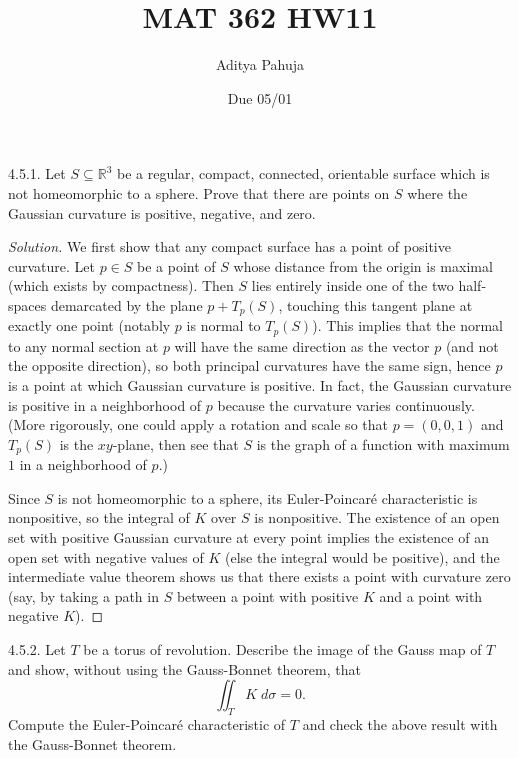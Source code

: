 \documentclass[10pt]{scrartcl}
\title{\vspace{-2em}MAT 362 HW11}
\author{\large Aditya Pahuja}
\date{\large Due 05/01}
\providecommand{\RR}{\mathbb R}
\providecommand{\dif}{\;d}
\newenvironment{soln}{\begin{proof}[Solution]}{\end{proof}}
\begin{document}
\maketitle

\begin{problem*}4.5.1.
	Let $S\subseteq\RR^3$ be a regular, compact, connected, orientable surface
	which is not homeomorphic to a sphere. Prove that there are points on $S$
	where the Gaussian curvature is positive, negative, and zero.
\end{problem*}

\begin{soln}
	We first show that any compact surface has a point of positive curvature.
	Let $p\in S$ be a point of $S$ whose distance from the origin is maximal
	(which exists by compactness). Then $S$ lies entirely inside
	one of the two half-spaces demarcated by the plane $p+T_p(S)$,
	touching this tangent plane at exactly one point
	(notably $p$ is normal to $T_p(S)$).
	This implies that the normal to any normal section at $p$ will have
	the same direction as the vector $p$ (and not the opposite direction),
	so both principal curvatures have the same sign, hence $p$
	is a point at which Gaussian curvature is positive.
	In fact, the Gaussian curvature is positive in a neighborhood of $p$
	because the curvature varies continuously.
	(More rigorously, one could apply a rotation and scale
	so that $p = (0,0,1)$ and $T_p(S)$ is the $xy$-plane, then see that
	$S$ is the graph of a function with maximum $1$ in a neighborhood of $p$.)
	
	Since $S$ is not homeomorphic to a sphere,
	its Euler-Poincar\'e characteristic is nonpositive,
	so the integral of $K$ over $S$ is nonpositive.
	The existence of an open set with positive Gaussian curvature at every point
	implies the existence of an open set with negative values of $K$
	(else the integral would be positive), and the intermediate value theorem
	shows us that there exists a point with curvature zero
	(say, by taking a path in $S$ between a point with positive $K$
	and a point with negative $K$).
\end{soln}

\begin{problem*}4.5.2.
	Let $T$ be a torus of revolution. Describe the image of
	the Gauss map of $T$ and show, without using the Gauss-Bonnet theorem, that
	\[\iint_TK\dif\sigma=0.\]
	Compute the Euler-Poincar\'e characteristic of $T$ and check
	the above result with the Gauss-Bonnet theorem.
\end{problem*}
\end{document}
